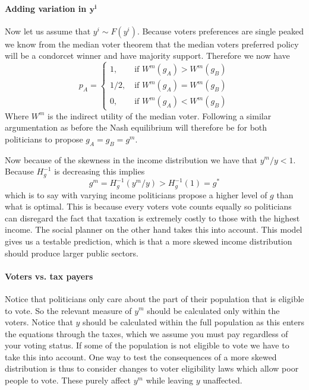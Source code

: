 \paragraph{Adding variation in $\bm{y^i}$} Now let us assume that $y^i\sim F(y^i)$. Because voters preferences are single peaked we know from the median voter theorem that the median voters preferred policy will be a condorcet winner and have majority support. Therefore we now have
\begin{equation}
    p_A =  
       \begin{cases}
          1, \qquad \text{if } W^m(g_A) > W^m(g_B) \\ 
          1/2, \quad \text{if } W^m(g_A) = W^m(g_B) \\
          0, \qquad \text{if } W^m(g_A) < W^m(g_B) 
       \end{cases}
\end{equation}
Where $W^m$ is the indirect utility of the median voter. Following a similar argumentation as before the Nash equilibrium will therefore be for both politicians to propose $g_A = g_B = g^m$.

Now because of the skewness in the income distribution we have that $y^m/y<1$. Because $H_g^{-1}$ is decreasing this implies
\begin{equation}
    g^m = H_g^{-1}(y^m/y) > H_g^{-1}(1) = g^*
\end{equation}
which is to say with varying income politicians propose a higher level of $g$ than what is optimal. This is because every voters vote counts equally so politicians can disregard the fact that taxation is extremely costly to those with the highest income. The social planner on the other hand takes this into account. This model gives us a testable prediction, which is that a more skewed income distribution should produce larger public sectors. 

\paragraph{Voters vs. tax payers} Notice that politicians only care about the part of their population that is eligible to vote. So the relevant measure of $y^m$ should be calculated only within the voters. Notice that $y$ should be calculated within the full population as this enters the equations through the taxes, which we assume you must pay regardless of your voting status. 
If some of the population is not eligible to vote we have to take this into account. One way to test the consequences of a more skewed distribution is thus to consider changes to voter eligibility laws which allow poor people to vote. These purely affect $y^m$ while leaving $y$ unaffected. 

